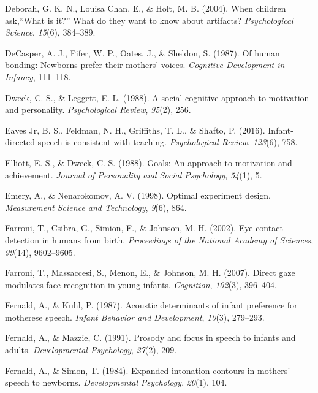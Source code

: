 \documentclass[oneside]{report}
\begin{document}
\leavevmode\hypertarget{ref-deborah2004children}{}%
Deborah, G. K. N., Louisa Chan, E., \& Holt, M. B. (2004). When children
ask,``What is it?'' What do they want to know about artifacts?
\emph{Psychological Science}, \emph{15}(6), 384--389.

\leavevmode\hypertarget{ref-decasper1987human}{}%
DeCasper, A. J., Fifer, W. P., Oates, J., \& Sheldon, S. (1987). Of
human bonding: Newborns prefer their mothers' voices. \emph{Cognitive
Development in Infancy}, 111--118.

\leavevmode\hypertarget{ref-dweck1988social}{}%
Dweck, C. S., \& Leggett, E. L. (1988). A social-cognitive approach to
motivation and personality. \emph{Psychological Review}, \emph{95}(2),
256.

\leavevmode\hypertarget{ref-eaves2016infant}{}%
Eaves Jr, B. S., Feldman, N. H., Griffiths, T. L., \& Shafto, P. (2016).
Infant-directed speech is consistent with teaching. \emph{Psychological
Review}, \emph{123}(6), 758.

\leavevmode\hypertarget{ref-elliott1988goals}{}%
Elliott, E. S., \& Dweck, C. S. (1988). Goals: An approach to motivation
and achievement. \emph{Journal of Personality and Social Psychology},
\emph{54}(1), 5.

\leavevmode\hypertarget{ref-emery1998optimal}{}%
Emery, A., \& Nenarokomov, A. V. (1998). Optimal experiment design.
\emph{Measurement Science and Technology}, \emph{9}(6), 864.

\leavevmode\hypertarget{ref-farroni2002eye}{}%
Farroni, T., Csibra, G., Simion, F., \& Johnson, M. H. (2002). Eye
contact detection in humans from birth. \emph{Proceedings of the
National Academy of Sciences}, \emph{99}(14), 9602--9605.

\leavevmode\hypertarget{ref-farroni2007direct}{}%
Farroni, T., Massaccesi, S., Menon, E., \& Johnson, M. H. (2007). Direct
gaze modulates face recognition in young infants. \emph{Cognition},
\emph{102}(3), 396--404.

\leavevmode\hypertarget{ref-fernald1987acoustic}{}%
Fernald, A., \& Kuhl, P. (1987). Acoustic determinants of infant
preference for motherese speech. \emph{Infant Behavior and Development},
\emph{10}(3), 279--293.

\leavevmode\hypertarget{ref-fernald1991prosody}{}%
Fernald, A., \& Mazzie, C. (1991). Prosody and focus in speech to
infants and adults. \emph{Developmental Psychology}, \emph{27}(2), 209.

\leavevmode\hypertarget{ref-fernald1984expanded}{}%
Fernald, A., \& Simon, T. (1984). Expanded intonation contours in
mothers' speech to newborns. \emph{Developmental Psychology},
\emph{20}(1), 104.
\end{document}
